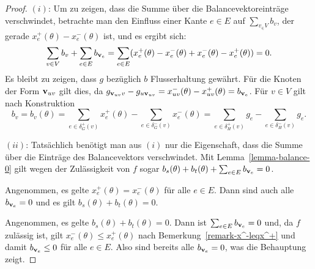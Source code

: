 \begin{proof}
	$(i)$: Um zu zeigen, dass die Summe über die Balancevektoreinträge verschwindet, betrachte man den Einfluss einer Kante $e\in E$ auf $\sum_{v_\in V} b_v$, der gerade $x_e^+(\theta) - x_e^-(\theta)$ ist, und es ergibt sich:
		$$\sum_{v\in V}b_v + \sum_{e\in E} b_{\mathbf{v}_e} = \sum_{e\in E}  (x_e^+(\theta) - x_e^-(\theta) + x_e^-(\theta) - x_e^+(\theta)) = 0.$$
		Es bleibt zu zeigen, dass $g$ bezüglich $b$ Flusserhaltung gewährt.
		Für die Knoten der Form $\mathbf{v}_{uv}$ gilt dies, da $g_{\mathbf{v}_{uv}v} - g_{u\mathbf{v}_{uv}} = x_{uv}^-(\theta) - x_{uv}^+(\theta) = b_{\mathbf{v}_e}$.
		Für $v\in V$ gilt nach Konstruktion $$b_v = b_v(\theta)=
		\sum_{e\in\delta^+_G(v)} x_{e}^+(\theta) - \sum_{e\in\delta^-_G(v)} x_{e}^-(\theta) =
	\sum_{e\in\delta_H^+(v)} g_e - \sum_{e\in\delta^-_H(v)}g_e
		.$$
	
	$(ii)$: Tatsächlich benötigt man aus $(i)$ nur die Eigenschaft, dass die Summe über die Einträge des Balancevektors verschwindet.
	Mit Lemma~\ref{lemma-balance-0} gilt wegen der Zulässigkeit von $f$ sogar $b_s(\theta)+b_t(\theta) + \sum_{e\in E} b_{\mathbf{v}_e} = 0$.
	
	Angenommen, es gelte $x_e^+(\theta) = x_e^-(\theta)$ für alle $e\in E$.
	Dann sind auch alle $b_{\mathbf{v}_e} = 0$ und es gilt $b_s(\theta) + b_t(\theta) = 0$.
	
	Angenommen, es gelte $b_s(\theta) + b_t(\theta) = 0$.
	Dann ist $\sum_{e\in E} b_{\mathbf{v}_e} = 0$ und, da $f$ zulässig ist, gilt $x_e^-(\theta)\leq x_e^+(\theta)$ nach Bemerkung~\ref{remark-x^-leqx^+}   und damit $b_{\mathbf{v}_e}\leq 0$ für alle $e\in E$.
	Also sind bereits alle $b_{\mathbf{v}_e} = 0$, was die Behauptung zeigt.
\end{proof}


